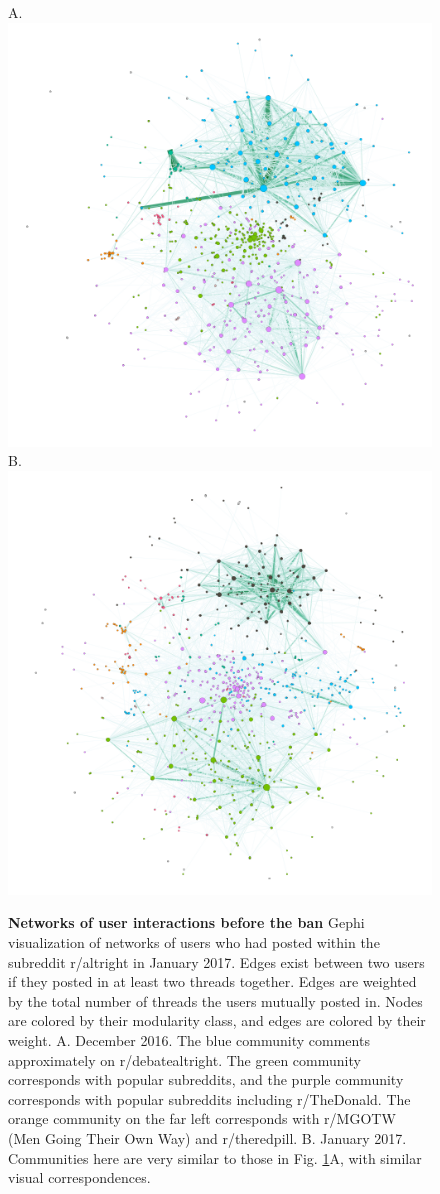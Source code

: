 \documentclass[twoside,twocolumn]{article}
\begin{document}
\begin{figure}
\centering
A.\includegraphics[width=0.6\linewidth]{dec2016net.png}
B.\includegraphics[width=0.6\linewidth]{jan2017net.png}
\caption{\textbf{Networks of user interactions before the ban} Gephi visualization of networks of users who had posted within the subreddit r/altright in January 2017. Edges exist between two users if they posted in at least two threads together. Edges are weighted by the total number of threads the users mutually posted in. Nodes are colored by their modularity class, and edges are colored by their weight. A. December 2016. The blue community comments approximately on r/debatealtright. The green community corresponds with popular subreddits, and the purple community corresponds with popular subreddits including r/The\textunderscore Donald. The orange community on the far left corresponds with r/MGOTW (Men Going Their Own Way) and r/theredpill. B. January 2017. Communities here are very similar to those in Fig. \ref{fig:1}A, with similar visual correspondences.}
\label{fig:1}
\end{figure}
\end{document}

